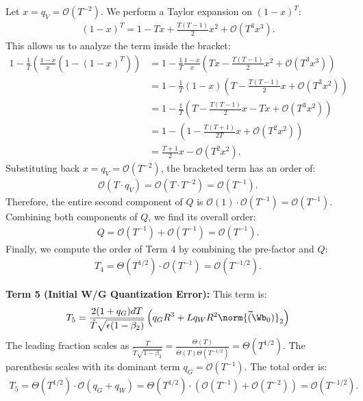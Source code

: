 \documentclass[11pt, letterpaper]{article}
\begin{document}
Let $x = q_V = \mathcal{O}(T^{-2})$. We perform a Taylor expansion on $(1-x)^T$:
\begin{align*}
    (1-x)^T = 1 - Tx + \frac{T(T-1)}{2}x^2 + \mathcal{O}(T^3x^3).
\end{align*}
This allows us to analyze the term inside the bracket:
\begin{align*}
    1 - \frac{1}{T} \left( \frac{1-x}{x}(1-(1-x)^T) \right) &= 1 - \frac{1}{T} \frac{1-x}{x}\left(Tx - \frac{T(T-1)}{2}x^2 + \mathcal{O}(T^3x^3)\right) \\
    &= 1 - \frac{1}{T} (1-x)\left(T - \frac{T(T-1)}{2}x + \mathcal{O}(T^3x^2)\right) \\
    &= 1 - \frac{1}{T} \left(T - \frac{T(T-1)}{2}x - Tx + \mathcal{O}(T^3x^2)\right) \\
    &= 1 - \left(1 - \frac{T(T+1)}{2T}x + \mathcal{O}(T^2x^2)\right) \\
    &= \frac{T+1}{2}x - \mathcal{O}(T^2x^2).
\end{align*}
Substituting back $x = q_V = \mathcal{O}(T^{-2})$, the bracketed term has an order of:
\begin{align*}
    \mathcal{O}(T \cdot q_V) = \mathcal{O}(T \cdot T^{-2}) = \mathcal{O}(T^{-1}).
\end{align*}
Therefore, the entire second component of $Q$ is $\mathcal{O}(1) \cdot \mathcal{O}(T^{-1}) = \mathcal{O}(T^{-1})$.
Combining both components of $Q$, we find its overall order:
\begin{align*}
    Q = \mathcal{O}(T^{-1}) + \mathcal{O}(T^{-1}) = \mathcal{O}(T^{-1}).
\end{align*}
Finally, we compute the order of Term 4 by combining the pre-factor and $Q$:
\begin{align*}
    T_4 = \Theta(T^{1/2}) \cdot \mathcal{O}(T^{-1}) = \mathcal{O}(T^{-1/2}).
\end{align*}

\textbf{Term 5 (Initial W/G Quantization Error):} This term is:
\begin{align*}
    T_5 = \frac{2(1+q_G) d T}{\tilde{T}\sqrt{\epsilon(1-\beta_2)}} \left( q_G R^3 + L q_W R^2 \norm{\vec(\Wb_0)}_2 \right)
\end{align*}
The leading fraction scales as $\frac{T}{\tilde{T}\sqrt{1-\beta_2}} = \frac{\Theta(T)}{\Theta(T)\Theta(T^{-1/2})} = \Theta(T^{1/2})$. The parenthesis scales with its dominant term $q_G=\mathcal{O}(T^{-1})$. The total order is:
\begin{align*}
    T_5 = \Theta(T^{1/2}) \cdot \mathcal{O}(q_G + q_W) = \Theta(T^{1/2}) \cdot (\mathcal{O}(T^{-1}) + \mathcal{O}(T^{-2})) = \mathcal{O}(T^{-1/2}).
\end{align*}
\end{document}
